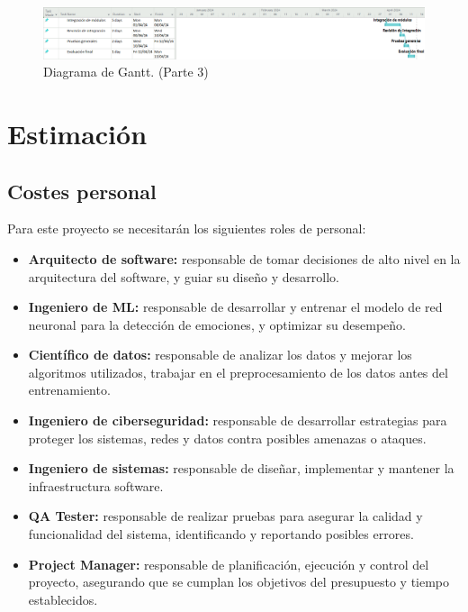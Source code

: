 \documentclass[12pt]{report} %
\begin{document}
\begin{figure}[H]
	\centering
	\includegraphics[width=\textwidth]{gantt3.png}
	\caption{Diagrama de Gantt. (Parte 3)}
	\label{fig:imagen38}
\end{figure}

\section{Estimación}

\subsection{Costes personal}

Para este proyecto se necesitarán los siguientes roles de personal:

\begin{itemize}

    \item \textbf{Arquitecto de software:} responsable de tomar decisiones de alto nivel en la arquitectura del software, y guiar su diseño y desarrollo.
    \item \textbf{Ingeniero de ML:} responsable de desarrollar y entrenar el modelo de red neuronal para la detección de emociones, y optimizar su desempeño.
    \item \textbf{Científico de datos:} responsable de analizar los datos y mejorar los algoritmos utilizados, trabajar en el preprocesamiento de los datos antes del entrenamiento.
	\item \textbf{Ingeniero de ciberseguridad:} responsable de desarrollar estrategias para proteger los sistemas, redes y datos contra posibles amenazas o ataques.
	\item \textbf{Ingeniero de sistemas:} responsable de diseñar, implementar y mantener la infraestructura software.
    \item \textbf{QA Tester:} responsable de realizar pruebas para asegurar la calidad y funcionalidad del sistema, identificando y reportando posibles errores.
    \item \textbf{Project Manager:} responsable de planificación, ejecución y control del proyecto, asegurando que se cumplan los objetivos del presupuesto y tiempo establecidos.

\end{itemize}
\end{document}
